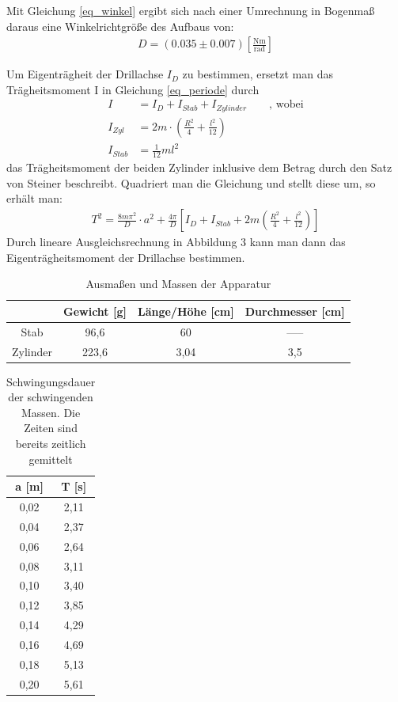 Mit Gleichung \eqref{eq_winkel} ergibt sich nach einer Umrechnung in Bogenmaß daraus eine Winkelrichtgröße des Aufbaus von:
\begin{align*}
D=(0.035 \pm 0.007) \left[\frac{\text{Nm}}{\text{rad}}\right]
\end{align*}


Um Eigenträgheit der Drillachse $I_D$ zu bestimmen, ersetzt man das Trägheitsmoment I in Gleichung \eqref{eq_periode} durch
\begin{align*}
I&=I_D+I_{Stab}+I_{Zylinder} \qquad \text{, wobei}\\
I_{Zyl}&=2m\cdot\left(\frac{R^2}{4}+\frac{l^2}{12}\right)\\
I_{Stab}&= \frac{1}{12}ml^2
\end{align*}
das Trägheitsmoment der beiden Zylinder inklusive dem Betrag durch den Satz von Steiner beschreibt.
Quadriert man die Gleichung und stellt diese um, so erhält man:
\begin{align}
T^2=\frac{8m\pi^2}{D}\cdot a^2 + \frac{4\pi}{D}  \left[  I_D+I_{Stab}+2m\left(\frac{R^2}{4}+\frac{l^2}{12}\right)\right]
\end{align}
Durch lineare Ausgleichsrechnung in Abbildung 3 kann man dann das Eigenträgheitsmoment der Drillachse bestimmen.
\begin{table}[H]
\begin{tabular}{|c|c|c|c|}
\hline 
 & Gewicht [g] & Länge/Höhe [cm] & Durchmesser [cm] \\ 
\hline 
Stab & 96,6 & 60 & ----- \\ 
\hline 
Zylinder & 223,6 & 3,04 & 3,5 \\ 
\hline 
\end{tabular}\newline
\caption{Ausmaßen und Massen der Apparatur}
\end{table}

\begin{table}[H]
\begin{tabular}{|c|c|}
\hline
a [m] &	T [s]\\ \hline
0,02	&2,11\\ \hline
0,04&	2,37\\ \hline
0,06&	2,64\\ \hline
0,08&	3,11\\ \hline
0,10&	3,40\\ \hline
0,12&	3,85\\ \hline
0,14&	4,29\\ \hline
0,16&	4,69\\ \hline
0,18&	5,13\\ \hline
0,20&	5,61\\ \hline
\end{tabular} 
\caption{Schwingungsdauer der schwingenden Massen. Die Zeiten sind bereits zeitlich gemittelt}
\end{table}

